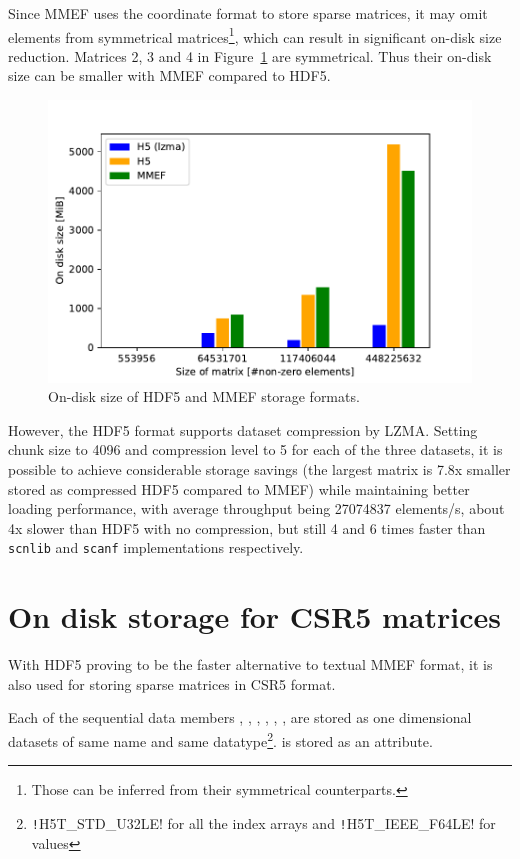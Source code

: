 \documentclass[thesis=M,english]{FITthesis}[2019/12/23]
\newcommand{\csre}[1]{\texttt!#1!}
\begin{document}
Since MMEF uses the coordinate format to store sparse matrices, it may omit elements from symmetrical
matrices\footnote{Those can be inferred from their symmetrical counterparts.}, 
which can result in significant on-disk size reduction. Matrices 2, 3 and 4 in Figure~\ref{impl:stor:size}
are symmetrical. Thus their on-disk size can be smaller with MMEF compared to HDF5.

\begin{figure}[htp]
    \centering
    \includegraphics[scale=0.7]{static/mmef_vs_h5_stor.pdf}
    \caption{On-disk size of HDF5 and MMEF storage formats.}\label{impl:stor:size}
\end{figure}

However, the HDF5 format supports dataset compression by LZMA\@. Setting chunk size to 4096 and compression level to 5 for each of the three datasets,
it is possible to achieve considerable storage savings (the largest matrix is 7.8x smaller stored as compressed HDF5 compared to MMEF)
while maintaining better loading performance, with average throughput being \num{27074837} elements/s, about 4x slower than HDF5 with no compression,
but still 4 and 6 times faster than \texttt{scnlib} and \texttt{scanf} implementations respectively.


\section{On disk storage for CSR5 matrices}\label{csr5:onDisk}

With HDF5 proving to be the faster alternative to textual MMEF format, it is also used for storing sparse
matrices in CSR5 format.

Each of the sequential data members , , , ,
, , are stored as one dimensional datasets of same name
and same datatype\footnote{\csre{H5T_STD_U32LE} for all the index arrays and \csre{H5T_IEEE_F64LE} for values}.
 is stored as an attribute.
\end{document}
